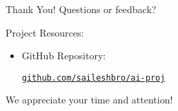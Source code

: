 \documentclass[aspectratio=169]{beamer}
\begin{document}
\begin{frame}{Thank You!}
  Questions or feedback?

  Project Resources:
  \begin{itemize}
    \item GitHub Repository:

          {\small\texttt{\href{https://github.com/saileshbro/ai-proj}{github.com/saileshbro/ai-proj}}}

  \end{itemize}

  We appreciate your time and attention!
\end{frame}
\end{document}
